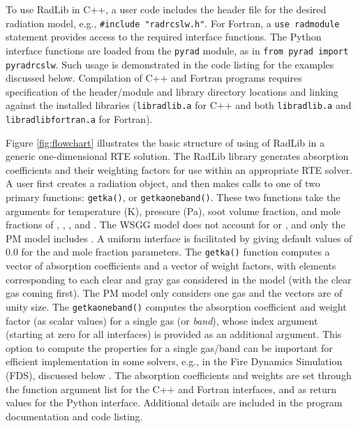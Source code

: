 \documentclass[preprint,12pt]{elsarticle}
\begin{document}
To use RadLib in C++, a user code includes the header file for the desired radiation model, e.g., \texttt{\#include "rad\textunderscore rcslw.h"}. For Fortran, a \texttt{use rad\textunderscore module} statement provides access to the required interface functions. The Python interface functions are loaded from the \texttt{pyrad} module, as in \texttt{from pyrad import pyrad\textunderscore rcslw}. Such usage is demonstrated in the code listing for the examples discussed below. Compilation of C++ and Fortran programs requires specification of the header/module and library directory locations and linking against the installed libraries (\texttt{libradlib.a} for C++ and both \texttt{libradlib.a} and \texttt{libradlib\textunderscore fortran.a} for Fortran).

Figure \ref{fig:flowchart} illustrates the basic structure of using of RadLib in a generic one-dimensional RTE solution. The RadLib library generates absorption coefficients and their weighting factors for use within an appropriate RTE solver. A user first creates a radiation object, and then makes calls to one of two primary functions: \texttt{get\textunderscore k\textunderscore a()}, or \texttt{get\textunderscore k\textunderscore a\textunderscore oneband()}.
These two functions take the arguments for temperature (K), pressure (Pa), soot volume fraction, and mole fractions of , , , and . The WSGG model does not account for  or , and only the PM model includes . A uniform interface is facilitated by giving default values of 0.0 for the  and  mole fraction parameters. The \texttt{get\textunderscore k\textunderscore a()} function computes a vector of absorption coefficients and a vector of weight factors, with elements corresponding to each clear and gray gas considered in the model (with the clear gas coming first). The PM model only considers one gas and the vectors are of unity size. The \texttt{get\textunderscore k\textunderscore a\textunderscore oneband()} computes the absorption coefficient and weight factor (as scalar values) for a single gas (or \emph{band}), whose index argument (starting at zero for all interfaces) is provided as an additional argument. This option to compute the properties for a single gas/band can be important for efficient implementation in some solvers, e.g., in the Fire Dynamics Simulation (FDS), discussed below \cite{FDS}. The absorption coefficients and weights are set through the function argument list for the C++ and Fortran interfaces, and as return values for the Python interface. Additional details are included in the program documentation and code listing.
\end{document}
